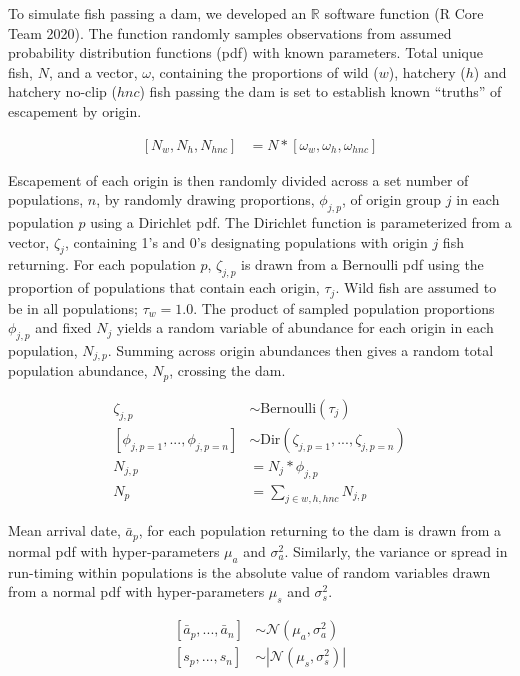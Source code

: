 \documentclass[
  12pt,
]{article}
\begin{document}
To simulate fish passing a dam, we developed an \(\mathbb{R}\) software function (R Core Team 2020). The function randomly samples observations from assumed probability distribution functions (pdf) with known parameters. Total unique fish, \(N\), and a vector, \(\omega\), containing the proportions of wild (\(w\)), hatchery (\(h\)) and hatchery no-clip (\(hnc\)) fish passing the dam is set to establish known ``truths'' of escapement by origin.

\[
\begin{aligned}
\left[N_{w}, N_{h}, N_{hnc} \right] &= N * \left[\omega_{w}, \omega_{h}, \omega_{hnc} \right]
\end{aligned}
\]

Escapement of each origin is then randomly divided across a set number of populations, \(n\), by randomly drawing proportions, \(\phi_{j,p}\), of origin group \(j\) in each population \(p\) using a Dirichlet pdf. The Dirichlet function is parameterized from a vector, \(\zeta_j\), containing 1's and 0's designating populations with origin \(j\) fish returning. For each population \(p\), \(\zeta_{j,p}\) is drawn from a Bernoulli pdf using the proportion of populations that contain each origin, \(\tau_j\). Wild fish are assumed to be in all populations; \(\tau_w = 1.0\). The product of sampled population proportions \(\phi_{j,p}\) and fixed \(N_j\) yields a random variable of abundance for each origin in each population, \(N_{j,p}\). Summing across origin abundances then gives a random total population abundance, \(N_p\), crossing the dam.

\[
\begin{aligned}
  \zeta_{j,p} &\sim \text{Bernoulli}(\tau_j) \\
  \left[\phi_{j,p=1},  ... , \phi_{j,p=n}\right] &\sim \text{Dir} \left(\zeta_{j,p=1},  ... , \zeta_{j,p=n} \right) \\
  N_{j,p} &= N_j * \phi_{j,p} \\
  N_p &= \sum_{j \in w, h, hnc} N_{j,p}
\end{aligned}
\]

Mean arrival date, \(\bar{a}_p\), for each population returning to the dam is drawn from a normal pdf with hyper-parameters \(\mu_a\) and \(\sigma^2_a\). Similarly, the variance or spread in run-timing within populations is the absolute value of random variables drawn from a normal pdf with hyper-parameters \(\mu_s\) and \(\sigma^2_s\).

\[
\begin{aligned}
 \left[\bar{a}_p, ..., \bar{a}_n\right] &\sim \mathcal{N}(\mu_a, \sigma^2_a) \\
 \left[s_p, ..., s_n\right] &\sim \left | \mathcal{N}(\mu_s, \sigma^2_s) \right |
\end{aligned}
\]
\end{document}

